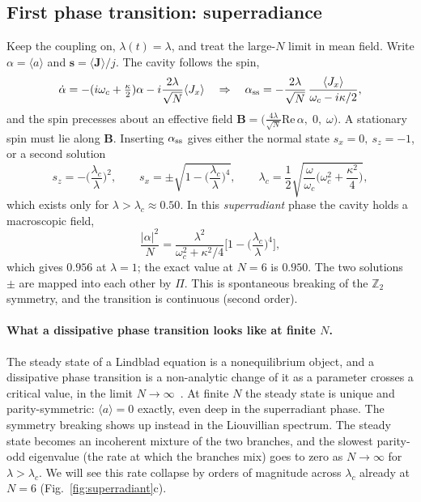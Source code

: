 \documentclass[11pt,a4paper]{article}
\newcommand{\ev}[1]{\langle #1\rangle}
\begin{document}
\subsection{First phase transition: superradiance}\label{sec:superradiance}

Keep the coupling on, $\lambda(t)=\lambda$, and treat the large-$N$ limit in mean field. Write
$\alpha=\ev a$ and $\bm s=\ev{\bm J}/j$. The cavity follows the spin,
\begin{equation}
\dot\alpha=-(i\omega_c+\tfrac\kappa2)\alpha-i\frac{2\lambda}{\sqrt N}\ev{J_x}
\quad\Rightarrow\quad
\alpha_{\rm ss}=-\frac{2\lambda}{\sqrt N}\,\frac{\ev{J_x}}{\omega_c-i\kappa/2},
\end{equation}
and the spin precesses about an effective field
$\bm B=\big(\tfrac{4\lambda}{\sqrt N}\mathrm{Re}\,\alpha,\;0,\;\omega\big)$. A stationary spin
must lie along $\bm B$. Inserting $\alpha_{\rm ss}$ gives either the normal state
$s_x=0,\ s_z=-1$, or a second solution
\begin{equation}
s_z=-\Big(\frac{\lambda_c}{\lambda}\Big)^2,\qquad
s_x=\pm\sqrt{1-\Big(\frac{\lambda_c}{\lambda}\Big)^4},\qquad
\lambda_c=\frac12\sqrt{\frac{\omega}{\omega_c}\Big(\omega_c^2+\frac{\kappa^2}4\Big)},
\label{eq:lambda_c}
\end{equation}
which exists only for $\lambda>\lambda_c\approx0.50$. In this \emph{superradiant} phase the cavity
holds a macroscopic field,
\begin{equation}
\frac{|\alpha|^2}{N}=\frac{\lambda^2}{\omega_c^2+\kappa^2/4}\Big[1-\Big(\frac{\lambda_c}{\lambda}\Big)^4\Big],
\label{eq:photons}
\end{equation}
which gives $0.956$ at $\lambda=1$; the exact value at $N=6$ is $0.950$. The two solutions
$\pm$ are mapped into each other by $\Pi$. This is spontaneous breaking of the $\mathbb Z_2$
symmetry, and the transition is continuous (second order).

\paragraph{What a dissipative phase transition looks like at finite $N$.} The steady state of a
Lindblad equation is a nonequilibrium object, and a dissipative phase transition is a
non-analytic change of it as a parameter crosses a critical value, in the limit
$N\to\infty$~\cite{minganti2018,kirton2019}. At finite $N$ the steady state is unique and
parity-symmetric: $\ev{a}=0$ exactly, even deep in the superradiant phase. The symmetry breaking
shows up instead in the Liouvillian spectrum. The steady state becomes an incoherent mixture of
the two branches, and the slowest parity-odd eigenvalue (the rate at which the branches mix)
goes to zero as $N\to\infty$ for $\lambda>\lambda_c$. We will see this rate collapse by orders of
magnitude across $\lambda_c$ already at $N=6$ (Fig.~\ref{fig:superradiant}c).
\end{document}
